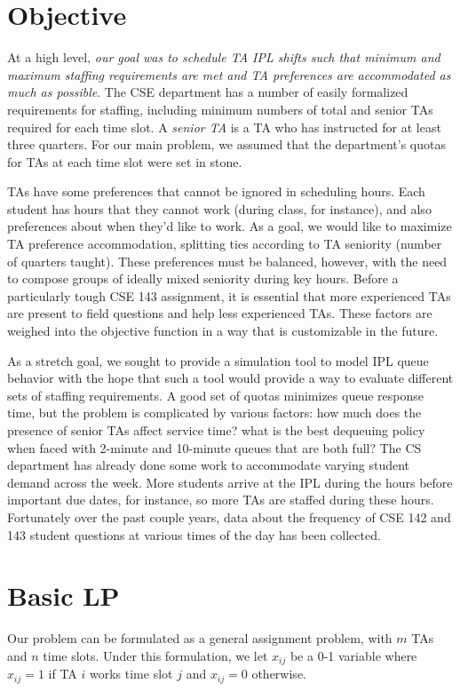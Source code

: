\documentclass{article}
\begin{document}
\begin{multicols}{2}
\section*{Objective}

At a high level, \textit{our goal was to schedule TA IPL shifts such that minimum and maximum staffing requirements are met and TA preferences are accommodated as much as possible}. The CSE department has a number of easily formalized requirements for staffing, including minimum numbers of total and senior TAs required for each time slot. A \textit{senior TA} is a TA who has instructed for at least three quarters. For our main problem, we assumed that the department's quotas for TAs at each time slot were set in stone.

TAs have some preferences that cannot be ignored in scheduling hours. Each student has hours that they cannot work (during class, for instance), and also preferences about when they'd like to work. As a goal, we would like to maximize TA preference accommodation, splitting ties according to TA seniority (number of quarters taught). These preferences must be balanced, however, with the need to compose groups of ideally mixed seniority during key hours. Before a particularly tough CSE 143 assignment, it is essential that more experienced TAs are present to field questions and help less experienced TAs. These factors are weighed into the objective function in a way that is customizable in the future.

As a stretch goal, we sought to provide a simulation tool to model IPL queue behavior with the hope that such a tool would provide a way to evaluate different sets of staffing requirements. A good set of quotas minimizes queue response time, but the problem is complicated by various factors: how much does the presence of senior TAs affect service time? what is the best dequeuing policy when faced with 2-minute and 10-minute queues that are both full? The CS department has already done some work to accommodate varying student demand across the week. More students arrive at the IPL during the hours before important due dates, for instance, so more TAs are staffed during these hours. Fortunately over the past couple years, data about the frequency of CSE 142 and 143 student questions at various times of the day has been collected.

\section*{Basic LP}
Our problem can be formulated as a general assignment problem, with $m$ TAs and $n$ time slots. Under this formulation, we let $x_{ij}$ be a 0-1 variable where $x_{ij} = 1$ if TA $i$ works time slot $j$ and $x_{ij} = 0$ otherwise.


\end{multicols}
\end{document}
